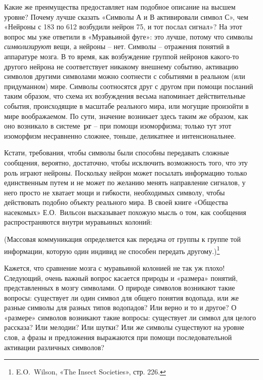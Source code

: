 \documentclass[../main.tex]{subfiles}
\begin{document}
Какие же преимущества предоставляет нам подобное описание на высшем уровне? Почему лучше сказать «Символы А и В активировали символ С», чем «Нейроны с 183 по 612 возбудили нейрон 75, и тот послал сигнал»? На этот вопрос мы уже ответили в «Муравьиной фуге»: это лучше, потому что символы \emph{символизируют} вещи, а нейроны \--- нет. Символы \--- отражения понятий в аппаратуре мозга. В то время, как возбуждение группой нейронов какого-то другого нейрона не соответствует никакому внешнему событию, активацию символов другими символами можно соотнести с событиями в реальном (или придуманном) мире. Символы соотносятся друг с другом при помощи посланий таким образом, что схема их возбуждения весьма напоминает действительные события, происходящие в масштабе реального мира, или могущие произойти в мире воображаемом. По сути, значение возникает здесь таким же образом, как оно возникало в системе~\textbf{pr} \--- при помощи изоморфизма; только тут этот изоморфизм несравненно сложнее, тоньше, деликатнее и интенсиональнее.

Кстати, требования, чтобы символы были способны передавать сложные сообщения, вероятно, достаточно, чтобы исключить возможность того, что эту роль играют нейроны. Поскольку нейрон может посылать информацию только единственным путем и не может по желанию менять направление сигналов, у него просто не хватает мощи и гибкости, необходимых символу, чтобы действовать подобно объекту реального мира. В своей книге «Общества насекомых» Е.О.~Вильсон высказывает похожую мысль о том, как сообщения распространяются внутри муравьиных колоний:

(Массовая коммуникация определяется как передача от группы к группе той информации, которую один индивид не способен передать другому.)\footnote{E.O.~Wilson, «The Insect Societies», стр. 226.}

Кажется, что сравнение мозга с муравьиной колонией не так уж плохо! Следующий, очень важный вопрос касается природы и «размера» понятий, представленных в мозгу символами. О природе символов возникают такие вопросы: существует ли один символ для общего понятия водопада, или же разные символы для разных типов водопадов? Или верно и то и другое? О «размере» символов возникают такие вопросы: существует ли символ для целого рассказа? Или мелодии? Или шутки? Или же символы существуют на уровне слов, а фразы и предложения выражаются при помощи последовательной активации различных символов?
\end{document}
